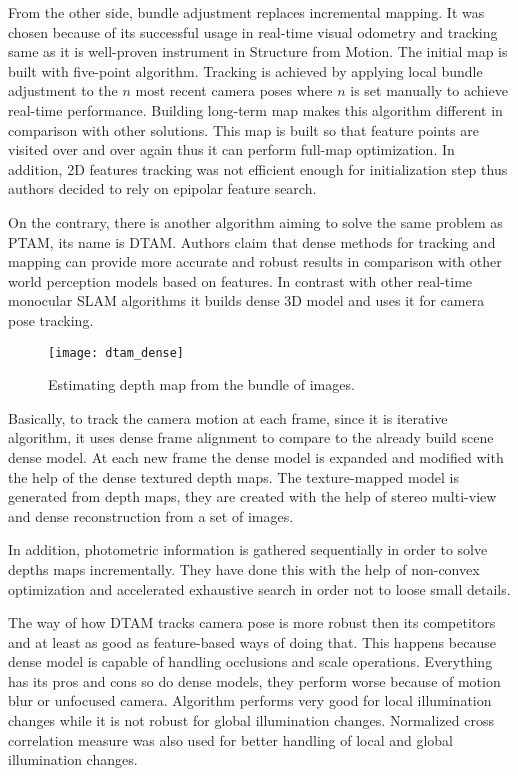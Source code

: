 \documentclass[../../../../main]{subfiles}
\begin{document}
From the other side, bundle adjustment replaces incremental mapping. It was chosen because of its successful usage in real-time visual odometry and tracking same as it is well-proven instrument in Structure from Motion. The initial map is built with five-point algorithm. Tracking is achieved by applying local bundle adjustment to the $n$ most recent camera poses where $n$ is set manually to achieve real-time performance. Building long-term map makes this algorithm different in comparison with other solutions. This map is built so that feature points are visited over and over again thus it can perform full-map optimization. In addition, 2D features tracking was not efficient enough for initialization step thus authors decided to rely on epipolar feature search.

On the contrary, there is another algorithm aiming to solve the same problem as \ac{PTAM}, its name is \ac{DTAM}. Authors claim that dense methods for tracking and mapping can provide more accurate and robust results in comparison with other world perception models based on features. In contrast with other real-time monocular \ac{SLAM} algorithms it builds dense 3D model and uses it for camera pose tracking.


\begin{figure} [ht!]
    \begin{center}
        \texttt{[image: dtam\_dense]}
        \caption{Estimating depth map from the bundle of images.}
        \label{fig:slam}
    \end{center}
\end{figure}

Basically, to track the camera motion at each frame, since it is iterative algorithm, it uses dense frame alignment to compare to the already build scene dense model. At each new frame the dense model is expanded and modified with the help of the dense textured depth maps. The texture-mapped model is generated from depth maps, they are created with the help of stereo multi-view and dense reconstruction from a set of images.

In addition, photometric information is gathered sequentially in order to solve depths maps incrementally. They have done this with the help of non-convex optimization and accelerated exhaustive search in order not to loose small details.

The way of how \ac{DTAM} tracks camera pose is more robust then its competitors and at least as good as feature-based ways of doing that. This happens because dense model is capable of handling occlusions and scale operations. Everything has its pros and cons so do dense models, they perform worse because of motion blur or unfocused camera. Algorithm performs very good for local illumination changes while it is not robust for global illumination changes. Normalized cross correlation measure was also used for better handling of local and global illumination changes.
\end{document}
